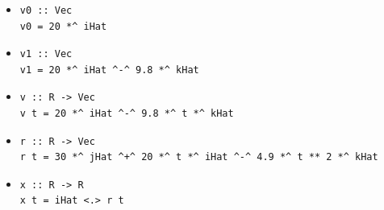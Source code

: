 \begin{itemize}
    \item[(a)]
\begin{lstlisting}
v0 :: Vec
v0 = 20 *^ iHat 
\end{lstlisting}
    \item[(b)]
\begin{lstlisting}
v1 :: Vec
v1 = 20 *^ iHat ^-^ 9.8 *^ kHat
\end{lstlisting}
    \item[(c)]
\begin{lstlisting}
v :: R -> Vec
v t = 20 *^ iHat ^-^ 9.8 *^ t *^ kHat
\end{lstlisting}
    \item[(d)]
\begin{lstlisting}
r :: R -> Vec
r t = 30 *^ jHat ^+^ 20 *^ t *^ iHat ^-^ 4.9 *^ t ** 2 *^ kHat
\end{lstlisting}
    \item[(e)]
\begin{lstlisting}
x :: R -> R
x t = iHat <.> r t
\end{lstlisting}
\end{itemize}
